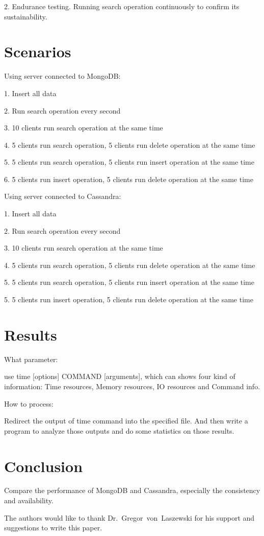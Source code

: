 2. Endurance testing. Running search operation continuously to confirm its 
sustainability.

\section{Scenarios}

Using server connected to MongoDB:

1. Insert all data

2. Run search operation every second

3. 10 clients run search operation at the same time

4. 5 clients run search operation, 5 clients run delete operation at the same time

5. 5 clients run search operation, 5 clients run insert operation at the same time

6. 5 clients run insert operation, 5 clients run delete operation at the same time


Using server connected to Cassandra:

1. Insert all data

2. Run search operation every second

3. 10 clients run search operation at the same time

4. 5 clients run search operation, 5 clients run delete operation at the same time

5. 5 clients run search operation, 5 clients run insert operation at the same time

5. 5 clients run insert operation, 5 clients run delete operation at the same time


\section{Results}
What parameter:

use time [options] COMMAND [arguments], which can shows four kind of information:
 Time resources, Memory resources, IO resources and Command info.

How to process:

Redirect the output of time command into the specified file. And then write a 
program to analyze those outputs and do some statistics on those results. 


\section{Conclusion}
Compare the performance of MongoDB and Cassandra, especially the consistency 
and availability.

\begin{acks}

  The authors would like to thank Dr.~Gregor~von~Laszewski for his
  support and suggestions to write this paper.

\end{acks}


 

